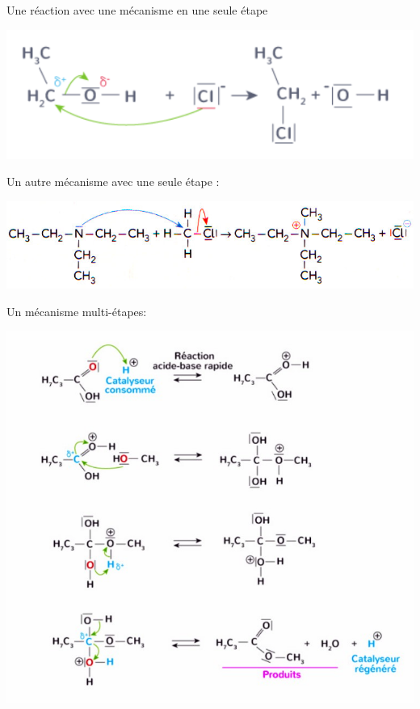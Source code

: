 \documentclass[11pt,a4paper]{article}
\begin{document}
\begin{eg}
Une réaction avec une mécanisme en une seule étape
\begin{center}
\includegraphics[width=0.7\linewidth]{imgs/c4/mecanisme1.png}    
\end{center}    
Un autre mécanisme avec une seule étape : 
\begin{center}
\includegraphics[width=0.7\linewidth]{imgs/c4/mecanisme3.jpg}    
\end{center} 
Un mécanisme multi-étapes: \begin{center}
\includegraphics[width=0.7\linewidth]{imgs/c4/mecanisme2.jpg}    
\end{center} 
\end{eg}
\end{document}
